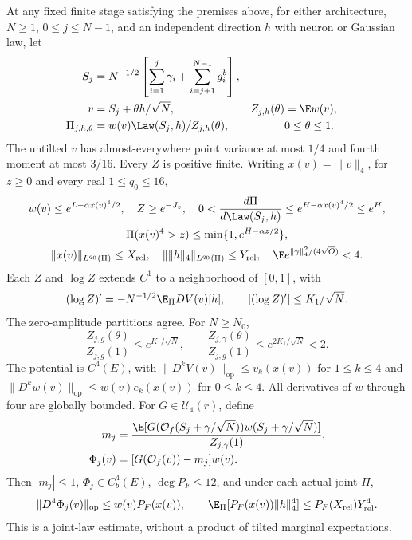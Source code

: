 \begin{theorem}
\label{uda:clause-b}
At any fixed finite stage satisfying the premises above, for either
architecture, $N\ge1$, $0\le j\le N-1$, and an independent direction
$h$ with neuron or Gaussian law, let
\begin{align*}
 S_j&=N^{-1/2}\left[\sum_{i=1}^j\gamma_i+
                         \sum_{i=j+1}^{N-1}g_i^b\right],\\
 v&=S_j+\theta h/\sqrt N,&Z_{j,h}(\theta)&=\E w(v),\\
 \Pi_{j,h,\theta}&=w(v)\Law(S_j,h)/Z_{j,h}(\theta),&&0\le\theta\le1.
\end{align*}
The untilted $v$ has almost-everywhere point variance at most $1/4$ and
fourth moment at most $3/16$. Every $Z$ is positive finite. Writing
$x(v)=\|v\|_4$, for $z\ge0$ and every real $1\le q_0\le16$,
\begin{gather*}
 w(v)\le e^{L-\alpha x(v)^4/2},\quad Z\ge e^{-J_z},\quad
 0<\frac{d\Pi}{d\Law(S_j,h)}\le e^{H-\alpha x(v)^4/2}\le e^H,\\
 \Pi(x(v)^4>z)\le\min\{1,e^{H-\alpha z/2}\},\\
 \|x(v)\|_{L^{q_0}(\Pi)}\le X_{\mathrm{rel}},\quad
 \|\|h\|_4\|_{L^{q_0}(\Pi)}\le Y_{\mathrm{rel}},\quad
 \E e^{\|\gamma\|_4^2/(4\sqrt O)}<4.
\end{gather*}
Each $Z$ and $\log Z$ extends $C^1$ to a neighborhood of $[0,1]$, with
\[
 (\log Z)'=-N^{-1/2}\E_\Pi DV(v)[h],\qquad
 |(\log Z)'|\le K_1/\sqrt N.
\]
The zero-amplitude partitions agree. For $N\ge N_0$,
\[
 \frac{Z_{j,g}(\theta)}{Z_{j,g}(1)}\le e^{K_1/\sqrt N},\qquad
 \frac{Z_{j,\gamma}(\theta)}{Z_{j,g}(1)}\le e^{2K_1/\sqrt N}<2.
\]
The potential is $C^4(E)$, with
$\|D^kV(v)\|_{\mathrm{op}}\le v_k(x(v))$ for $1\le k\le4$ and
$\|D^kw(v)\|_{\mathrm{op}}\le w(v)e_k(x(v))$ for $0\le k\le4$.
All derivatives of $w$ through four are globally bounded. For
$G\in\mathcal U_4(r)$, define
\begin{align*}
 m_j&=\frac{\E[G(\mathcal O_f(S_j+\gamma/\sqrt N))
                       w(S_j+\gamma/\sqrt N)]}{Z_{j,\gamma}(1)},\\
 \Phi_j(v)&=[G(\mathcal O_f(v))-m_j]w(v).
\end{align*}
Then $|m_j|\le1$, $\Phi_j\in C_b^4(E)$, $\deg P_F\le12$, and under
each actual joint $\Pi$,
\[
 \|D^4\Phi_j(v)\|_{\mathrm{op}}\le w(v)P_F(x(v)),\qquad
 \E_\Pi[P_F(x(v))\|h\|_4^4]\le P_F(X_{\mathrm{rel}})Y_{\mathrm{rel}}^4.
\]
This is a joint-law estimate, without a product of tilted marginal expectations.
\end{theorem}

